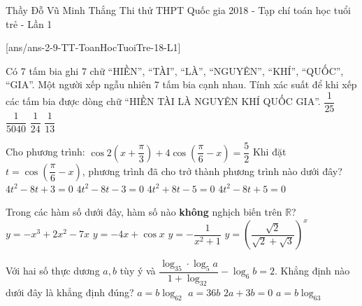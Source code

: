\begin{name}
{Thầy Đỗ Vũ Minh Thắng}
{Thi thử THPT Quốc gia 2018 - Tạp chí toán học tuổi trẻ - Lần 1}
\end{name}
\setcounter{ex}{0}
[ans/ans-2-9-TT-ToanHocTuoiTre-18-L1]
\begin{ex}%
	Có 7 tấm bia ghi 7 chữ “HIỀN”, “TÀI”, “LÀ”, “NGUYÊN”, “KHÍ”, “QUỐC”, “GIA”. Một người xếp ngẫu nhiên 7 tấm bia cạnh nhau. Tính xác suất để khi xếp các tấm bia được dòng chữ “HIỀN TÀI LÀ NGUYÊN KHÍ QUỐC GIA”. 
	\choice
	{$\dfrac{1}{25}$}
	{\True $\dfrac{1}{5040}$}
	{$\dfrac{1}{24}$}
	{$\dfrac{1}{13}$}
\end{ex}

\begin{ex}%
	Cho phương trình: 
$\cos 2(x+\dfrac{\pi}{3})+4\cos(\dfrac{\pi}{6}-x)=\dfrac{5}{2}$
	Khi đặt $t=\cos(\dfrac{\pi}{6}-x)$, phương trình đã cho trở thành phương trình nào dưới đây? 
	\choice
	{\True $4t^2-8t+3=0 $}
	{$4t^2-8t-3=0 $}
	{$4t^2+8t-5=0 $}
	{$4t^2-8t+5=0 $}
\end{ex}

\begin{ex}%
	Trong các hàm số dưới đây, hàm số nào \textbf{không} nghịch biến trên $\mathbb{R}$?
	\choice
	{$y=-x^3+2x^2-7x $}
	{$y=-4x+\cos x $}
	{\True $y=-\dfrac{1}{x^2+1}$}
	{$y=\left (\dfrac{\sqrt{2}}{\sqrt{2}+\sqrt{3}}\right )^x$}
\end{ex}

\begin{ex}%
	Với hai số thực dương $a, b$ tùy ý và $\dfrac{\log_35\cdot \log_5a}{1+\log_32}-\log_6b=2$. Khẳng định nào dưới đây là khẳng định đúng? 
	\choice
	{$a=b\log_62 $}
	{\True $a=36b $}
	{$2a+3b=0 $}
	{$a=b\log_63 $}
\end{ex}

